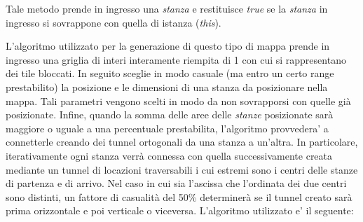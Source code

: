 \documentclass[12pt]{book}
\begin{document}
\par{Tale metodo prende in ingresso una \emph{stanza} e restituisce \emph{true} se la \emph{stanza} in ingresso si sovrappone con quella di istanza (\emph{this}).\fi
 \par{L'algoritmo utilizzato per la generazione di questo tipo di mappa prende in ingresso una griglia di interi interamente riempita di 1 con cui si rappresentano dei tile bloccati. In seguito sceglie in modo casuale (ma entro un certo range prestabilito) la posizione e le dimensioni di una stanza da posizionare nella mappa. Tali parametri vengono scelti in modo da non sovrapporsi con quelle gi\`a posizionate. Infine, quando la somma delle aree delle \emph{stanze} posizionate sar\`a maggiore o uguale a una percentuale prestabilita, l'algoritmo provvedera' a connetterle creando dei tunnel ortogonali da una stanza a un'altra. In particolare, iterativamente ogni stanza verr\`a connessa con quella successivamente creata mediante un tunnel di locazioni traversabili i cui estremi sono i centri delle stanze di partenza e di arrivo.  Nel caso in cui sia l'ascissa che l'ordinata dei due centri sono distinti, un fattore di casualit\`a del 50\% determiner\`a se il tunnel creato sar\`a prima orizzontale e poi verticale o viceversa.} L'algoritmo utilizzato e' il seguente:\par

}
\end{document}
